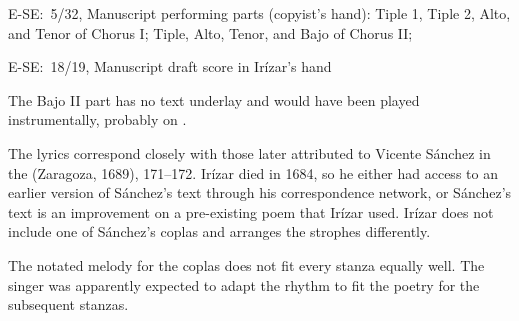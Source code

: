 
\begin{notesources}
\item E-SE:~5/32, Manuscript performing parts (copyist's hand): Tiple 1, Tiple 2, Alto, and Tenor of Chorus I; Tiple, Alto, Tenor, and Bajo of Chorus II; 
\item E-SE:~18/19, Manuscript draft score in Irízar's hand
\end{notesources}

The Bajo II part has no text underlay and would have been played instrumentally, probably on .

The lyrics correspond closely with those later attributed to Vicente Sánchez in the  (Zaragoza, 1689), 171--172.
Irízar died in 1684, so he either had access to an earlier version of Sánchez's text through his correspondence network, or Sánchez's text is an improvement on a pre-existing poem that Irízar used.
Irízar does not include one of Sánchez's coplas and arranges the strophes differently.

The notated melody for the coplas does not fit every stanza equally well.
The singer was apparently expected to adapt the rhythm to fit the poetry for the subsequent stanzas.
